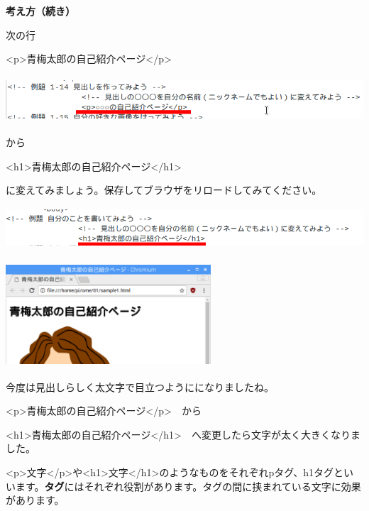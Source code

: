 \documentclass[a4paper,12pt]{jarticle}
\begin{document}
\clearpage
	\flushleft
\textbf{考え方（続き）}




次の行

{\textless}p{\textgreater}青梅太郎の自己紹介ページ{\textless}/p{\textgreater}

\bigskip

\includegraphics[width=16.217cm,height=1.739cm]{textbook-img158.png}

から

{\textless}h1{\textgreater}青梅太郎の自己紹介ページ{\textless}/h1{\textgreater}

に変えてみましょう。保存してブラウザをリロードしてみてください。


\bigskip

\includegraphics[width=15.18cm,height=1.528cm]{textbook-img157.png}


\bigskip


\bigskip

\includegraphics[width=7.638cm,height=3.939cm]{textbook-img156.png}


今度は見出しらしく太文字で目立つようにになりましたね。




\bigskip

{\textless}p{\textgreater}青梅太郎の自己紹介ページ{\textless}/p{\textgreater}　から

{\textless}h1{\textgreater}青梅太郎の自己紹介ページ{\textless}/h1{\textgreater}　へ変更したら文字が太く大きくなりました。


\bigskip

{\textless}p{\textgreater}文字{\textless}/p{\textgreater}や{\textless}h1{\textgreater}文字{\textless}/h1{\textgreater}のようなものをそれぞれpタグ、h1タグといいます。\textbf{タグ}にはそれぞれ役割があります。タグの間に挟まれている文字に効果があります。
\end{document}
